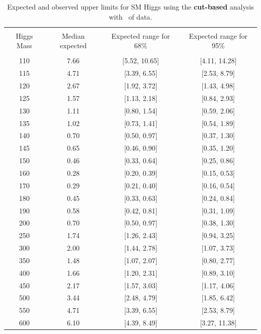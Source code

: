 \begin{table}[hbp!]
\begin{center}
\begin{tabular}{c c c c}
\hline
\vspace{-3mm} && \\
 Higgs Mass   & Median expected & Expected range for 68\% & Expected range for 95\%   \\
\vspace{-3mm} && \\
\hline
110 &  7.66 & [5.52, 10.65] & [4.11, 14.28] \\
115 &  4.71 & [3.39, 6.55] & [2.53, 8.79] \\
120 &  2.67 & [1.92, 3.72] & [1.43, 4.98] \\
125 &  1.57 & [1.13, 2.18] & [0.84, 2.93] \\
130 &  1.11 & [0.80, 1.54] & [0.59, 2.06] \\
135 &  1.02 & [0.73, 1.41] & [0.54, 1.89] \\
140 &  0.70 & [0.50, 0.97] & [0.37, 1.30] \\
145 &  0.65 & [0.46, 0.90] & [0.35, 1.20] \\
150 &  0.46 & [0.33, 0.64] & [0.25, 0.86] \\
160 &  0.28 & [0.20, 0.39] & [0.15, 0.53] \\
170 &  0.29 & [0.21, 0.40] & [0.16, 0.54] \\
180 &  0.45 & [0.33, 0.63] & [0.24, 0.84] \\
190 &  0.58 & [0.42, 0.81] & [0.31, 1.09] \\
200 &  0.70 & [0.50, 0.97] & [0.38, 1.30] \\
250 &  1.74 & [1.26, 2.43] & [0.94, 3.25] \\
300 &  2.00 & [1.44, 2.78] & [1.07, 3.73] \\
350 &  1.48 & [1.07, 2.07] & [0.80, 2.77] \\
400 &  1.66 & [1.20, 2.31] & [0.89, 3.10] \\
450 &  2.17 & [1.57, 3.03] & [1.17, 4.06] \\
500 &  3.44 & [2.48, 4.79] & [1.85, 6.42] \\
550 &  4.71 & [3.39, 6.55] & [2.53, 8.79] \\
600 &  6.10 & [4.39, 8.49] & [3.27, 11.38] \\
\hline
\end{tabular}
\caption{Expected and observed upper limits for SM Higgs using the
  {\bf cut-based} analysis with \intlumiEightTeV\ of data.}
\label{tab:cutbase_uls}
\end{center}
\end{table}

